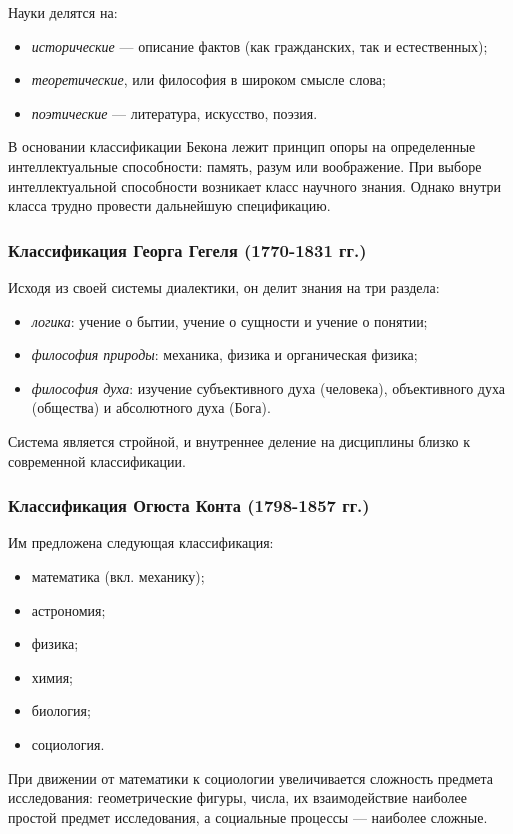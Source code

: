 Науки делятся на: 
\begin{itemize}
    \item \textit{исторические} --- описание фактов (как гражданских, так и естественных);
    \item \textit{теоретические}, или философия в широком смысле слова;
    \item \textit{поэтические} --- литература, искусство, поэзия. 
\end{itemize}

В основании классификации Бекона лежит принцип опоры на определенные
интеллектуальные способности: память, разум или воображение. 
При выборе интеллектуальной способности возникает
класс научного знания. Однако внутри класса трудно провести дальнейшую
спецификацию. 

\subsubsection{Классификация Георга Гегеля (1770-1831 гг.)}

Исходя из своей системы диалектики, он делит знания на три раздела: 
\begin{itemize}
    \item \textit{логика}: учение о бытии, учение о сущности и учение о понятии;
    \item \textit{философия природы}: механика, физика и органическая физика;  
    \item \textit{философия духа}: изучение субъективного духа (человека), объективного духа (общества) и абсолютного духа (Бога). 
\end{itemize}

Система является стройной, и внутреннее деление на дисциплины близко к современной классификации. 

\subsubsection{Классификация Огюста Конта (1798-1857 гг.)}

Им предложена следующая классификация:

\begin{itemize}
    \item математика (вкл. механику);
    \item астрономия;
    \item физика;
    \item химия;
    \item биология;
    \item социология.
\end{itemize}
При движении от математики к социологии
увеличивается сложность предмета исследования: геометрические фигуры, числа, их
взаимодействие наиболее простой предмет исследования, а социальные процессы ---
наиболее сложные. 

